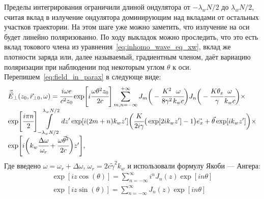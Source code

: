 Пределы интегрирования ограничили длиной ондулятора от $-\lambda_w N/2$ до $\lambda_w N/2$, считая вклад в излучение ондулятора доминирующим над вкладами от остальных участков траектории. На этом шаге уже можно заметить, что излучение на оси будет линейно поляризованно. По ходу выкладок можно проследить, что это есть вклад токового члена из уравнения~\ref{eq:inhomo_wave_eq_xw}, вклад же плотности заряда или, далее называемый, градиентным членом, даёт вариацию поляризации при наблюдении под некоторым углом $\theta$ к оси.
Перепишем~\ref{eq:field_in_parax} в следующе виде:
\begin{equation}
		\label{eq:field_in_parax_Bessel}
		\begin{array}{lcl}
			\vec{\widetilde{E}}_{\bot}(z_0,  \vec{r}_{\bot 0}, \omega) =
			\cfrac{i\omega e}{c^2z_0} \exp[i\cfrac{\omega \theta^2 z_0}{2c}]
			\displaystyle\sum_{m,n=-\infty}^{+\infty}
			J_m\bigg(-\cfrac{K^2}{8\gamma^2}\cfrac{\omega}{k_w c}\bigg)
			J_n\bigg(-\cfrac{K{\theta_x}}{\gamma}\cfrac{\omega}{k_w c}\bigg)\times\\
			\exp[\cfrac{i\pi n}{2}]
			\displaystyle\int\limits_{-\lambda_w N/2}^{\lambda_w N/2} dz'\exp[i(2m + n)k_wz']
			\bigg(\cfrac{K}{2i\gamma}\big(\exp[2ik_w z'] - 1\big)\vec{e_x} + \vec{\theta}\exp[ik_w z']\bigg)\times\\
			\exp[i\bigg(k_w \cfrac{\Delta\omega}{\omega_r} + 
			\cfrac{\omega\vec{\theta}^2}{2c}\bigg)z'],
		\end{array}	
\end{equation}
Где введено $\omega = \omega_r + \Delta\omega$, $\omega_r = 2c\widetilde{\gamma}^2k_w$ и использовали формулу Якоби — Ангера:
\begin{equation}
	\begin{array}{lcl}
		\exp[iz\cos(\theta)] = 
		\displaystyle\sum\limits_{n =-\infty}^{\infty}
		i^n J_n(z)\exp[in\theta]\\	
		\exp[iz\sin(\theta)] = 
		\displaystyle\sum\limits_{n =-\infty}^{\infty}
		J_n(z)\exp[in\theta]
	\end{array}	
\end{equation}

